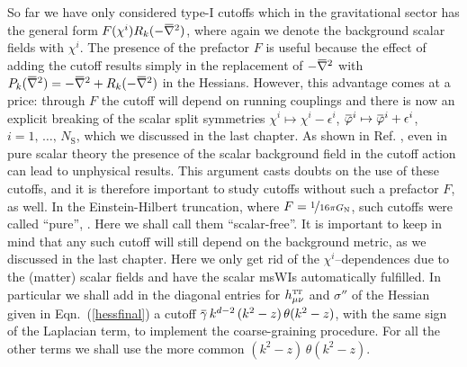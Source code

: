 \documentclass[11pt]{book}
\newcommand{\overbar}[1]{\mkern 1.5mu\overline{\mkern-1.5mu#1\mkern-1.5mu}\mkern 1.5mu}
\newcommand\TTspace{ -1pt }
\newcommand\hTTmunu{ h^{\scriptscriptstyle{\mathrm{T\hspace{\TTspace}T}}}_{\mu\nu} }
\newcommand\NS{ N_{\scriptscriptstyle{\mathrm{S}}} }
\newcommand\GNewton{ G_{\scriptscriptstyle{\mathrm{N}}}{} }
\newcommand{\bnabla}{\overbar \nabla}
\newcommand{\bp}{\overbar \varphi}
\newcommand{\bg}{\overbar \gamma}
\newcommand\eg{\textit{e.g.}\ }
\numberwithin{equation}{chapter}
\begin{document}
So far we have only considered type-I cutoffs which in the gravitational
sector has the general form $F(\chi^i)R_k(-\bnabla^2)$, where again we denote
the background scalar fields with $\chi^i$.
The presence of the prefactor $F$ is useful because the effect
of adding the cutoff results simply in the replacement of
$-\bnabla^2$ with $P_k(\bnabla^2)=-\bnabla^2+R_k(-\bnabla^2)$
in the Hessians.
However, this advantage comes at a price:
through $F$ the cutoff will depend on running couplings
and there is now an explicit breaking of the scalar split symmetries
$\chi^i \mapsto \chi^i - \epsilon^i$,
$\bp ^i \mapsto \bp ^i + \epsilon^i$, $i=1,\,\dots,\,\NS$, which we discussed in the last chapter.
As shown in Ref. \cite{Bridle:2013sra}, even in pure scalar theory
the presence of the scalar background field
in the cutoff action can lead to unphysical results.
This argument casts doubts on the use of these cutoffs,
and it is therefore important to study cutoffs without
such a prefactor $F$, as well.
In the Einstein-Hilbert truncation, where $F=\nicefrac{1}{16\pi \GNewton}$,
such cutoffs were called ``pure'', \cite{Narain:2009qa}.
Here we shall call them ``scalar-free''.
It is important to keep in mind that any such cutoff will still
depend on the background metric, as we discussed in the last chapter.
Here we only get rid of the $\chi^i$--dependences due to the (matter) scalar fields
and have the scalar msWIs automatically fulfilled.
In particular we shall add in the diagonal entries for $\hTTmunu$
and $\sigma''$ of the Hessian given in Eqn.~(\ref{hessfinal})
a cutoff $\bg \, k^{d-2} \, (k^2-z) \, \theta(k^2-z)$,
with the same sign of the Laplacian term, to implement the coarse-graining procedure.
For all the other terms we shall use the more common
$(k^2-z) \, \theta(k^2-z)$.
\end{document}
